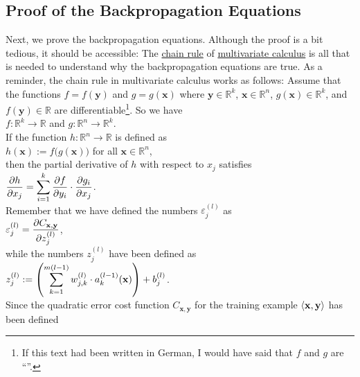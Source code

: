 \subsection{Proof of the Backpropagation Equations}
Next, we prove the backpropagation equations.  Although the proof is a bit tedious, it should be accessible: The
\href{https://en.wikipedia.org/wiki/Chain_rule}{chain rule}  of
\href{https://en.wikipedia.org/wiki/Multivariable_calculus}{multivariate calculus} is all that is needed to  
understand why the backpropagation equations are true.  As a reminder, the chain rule in multivariate calculus
works as follows: Assume that the functions $f = f(\mathbf{y})$ and $g = g(\mathbf{x})$ where $\mathbf{y} \in \mathbb{R}^k$,
$\mathbf{x} \in \mathbb{R}^n$,  $g(\mathbf{x}) \in \mathbb{R}^k$, and $f(\mathbf{y}) \in \mathbb{R}$ are
differentiable\footnote{
  If this text had been written in German, I would have said that $f$ and $g$ are ``''.
}.  So we have
\\[0.2cm]
\hspace*{1.3cm}
$f: \mathbb{R}^k \rightarrow \mathbb{R}$ \quad and \quad
$g: \mathbb{R}^n \rightarrow \mathbb{R}^k$. 
\\[0.2cm]
If the function $h: \mathbb{R}^n \rightarrow \mathbb{R}$ is defined as
\\[0.2cm]
\hspace*{1.3cm}
$h(\mathbf{x}) := f\bigl(g(\mathbf{x})\bigr)$ \quad for all $\mathbf{x} \in \mathbb{R}^n$,
\\[0.2cm]
then the partial derivative of $h$ with respect to $x_j$ satisfies
\\[0.2cm]
\hspace*{1.3cm}
$\displaystyle \frac{\partial h}{\partial x_j} = 
 \sum\limits_{i=1}^k \frac{\partial f}{\partial y_i} \cdot \frac{\partial g_i}{\partial x_j}
$.
\\[0.2cm]
Remember that we have defined the numbers $\varepsilon_j^{(l)}$ as
\\[0.2cm]
\hspace*{1.3cm}
$\displaystyle\varepsilon_j^{(l)} = \frac{\partial C_{\mathbf{x}, \mathbf{y}}}{\partial z_j^{(l)}}$,
\\[0.2cm]
while the numbers $z_j^{(l)}$ have been defined as
\\[0.2cm]
\hspace*{1.3cm}
$\displaystyle z_j^{(l)} := \left(\sum\limits_{k=1}^{m(l-1)}  w_{j,k}^{(l)} \cdot a_k^{(l-1)}(\mathbf{x})\right) + b_j^{(l)}$.
\\[0.2cm]
Since the quadratic error cost function $C_{\mathbf{x}, \mathbf{y}}$ for the training example $\pair(\mathbf{x}, \mathbf{y})$ has been defined 
